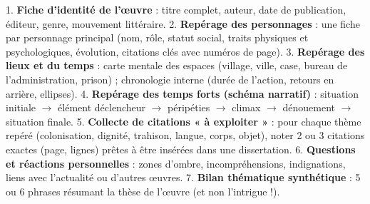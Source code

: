 \documentclass[11pt]{article}
\begin{document}
\begin{methode}
1. \textbf{Fiche d'identité de l'œuvre} : titre complet, auteur, date de publication, éditeur, genre, mouvement littéraire.
2. \textbf{Repérage des personnages} : une fiche par personnage principal (nom, rôle, statut social, traits physiques et psychologiques, évolution, citations clés avec numéros de page).
3. \textbf{Repérage des lieux et du temps} : carte mentale des espaces (village, ville, case, bureau de l'administration, prison) ; chronologie interne (durée de l'action, retours en arrière, ellipses).
4. \textbf{Repérage des temps forts (schéma narratif)} : situation initiale $\rightarrow$ élément déclencheur $\rightarrow$ péripéties $\rightarrow$ climax $\rightarrow$ dénouement $\rightarrow$ situation finale.
5. \textbf{Collecte de citations « à exploiter »} : pour chaque thème repéré (colonisation, dignité, trahison, langue, corps, objet), noter 2 ou 3 citations exactes (page, lignes) prêtes à être insérées dans une dissertation.
6. \textbf{Questions et réactions personnelles} : zones d'ombre, incompréhensions, indignations, liens avec l'actualité ou d'autres œuvres.
7. \textbf{Bilan thématique synthétique} : 5 ou 6 phrases résumant la thèse de l'œuvre (et non l'intrigue !).
\end{methode}
\end{document}
